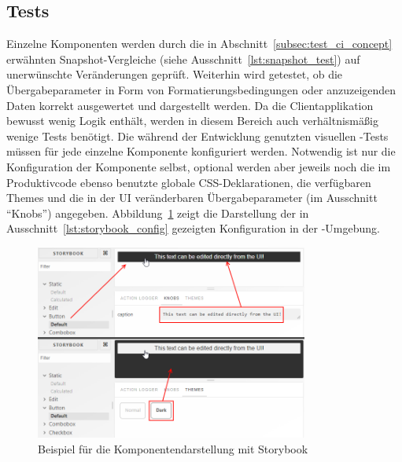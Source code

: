\subsection{Tests}
Einzelne Komponenten werden durch die in Abschnitt~\ref{subsec:test_ci_concept} erwähnten Snapshot-Vergleiche (siehe Ausschnitt~\ref{lst:snapshot_test}) auf unerwünschte Veränderungen geprüft. Weiterhin wird getestet, ob die Übergabeparameter in Form von Formatierungsbedingungen oder anzuzeigenden Daten korrekt ausgewertet und dargestellt werden. Da die Clientapplikation bewusst wenig Logik enthält, werden in diesem Bereich auch verhältnismäßig wenige Tests benötigt.
Die während der Entwicklung genutzten visuellen -Tests müssen für jede einzelne Komponente konfiguriert werden. Notwendig ist nur die Konfiguration der Komponente selbst, optional werden aber jeweils noch die im Produktivcode ebenso benutzte globale CSS-Deklarationen, die verfügbaren Themes und die in der UI veränderbaren Übergabeparameter (im Ausschnitt \enquote{Knobs}) angegeben. Abbildung~\ref{fig:storybook_example} zeigt die Darstellung der in Ausschnitt~\ref{lst:storybook_config} gezeigten Konfiguration in der -Umgebung.





\begin{figure}
    \centering
    \captionsetup{justification=centering}
    \includegraphics[width=0.8\textwidth]{figures/storybook_example.png}
        \caption{Beispiel für die Komponentendarstellung mit Storybook}\label{fig:storybook_example}
\end{figure}

